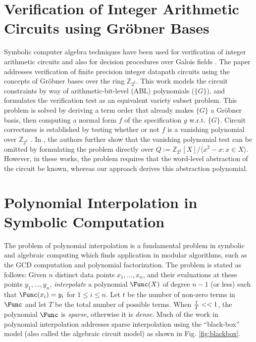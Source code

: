 \section{Verification of Integer Arithmetic Circuits using Gr\"obner Bases}
Symbolic computer algebra techniques have been used for verification
of integer arithmetic circuits \cite{wienand:cav08} and also for
decision procedures over Galois fields \cite{gao:gf-gb-ms}. The paper
\cite{wienand:cav08} addresses verification of finite precision
integer datapath circuits using the concepts of  Gr\"obner bases over
the ring ${\mathbb{Z}}_{2^k}$. This work models the circuit constraints by
way of arithmetic-bit-level (ABL) polynomials ($\{G\}$), and formulates
the verification test as an equivalent variety subset problem. This problem
is solved by deriving a term order that already makes $\{G\}$
a Gr\"obner basis, then computing a normal form $f$ of the
specification $g$ w.r.t. $\{G\}$. Circuit correctness is established
by testing whether or not $f$ is a vanishing
polynomial over ${\mathbb{Z}}_{2^k}$ \cite{shekhar:tcad07}.
In \cite{wedler:date11}, the
authors further show that the vanishing polynomial test can be omitted
by formulating the problem directly over $Q := {\mathbb{Z}}_{2^k}
[X]/\langle x^2-x : x \in X \rangle$.  
However, in these works, the problem requires that the word-level 
abstraction of the circuit be known, whereas our approach derives 
this abstraction polynomial. 

\section{Polynomial Interpolation in Symbolic Computation}

The problem of polynomial interpolation is a fundamental problem in
symbolic and algebraic computing which finds application in modular
algorithms, such as the GCD computation and polynomial
factorization. The problem is stated as follows: Given $n$ distinct
data points $x_1, \dots, x_n$, and their evaluations at these points
$y_1, \dots, y_n$,  {\it interpolate} a polynomial $\Func(X)$ of degree
$n-1$ (or less) such that $\Func(x_i) = y_i$ for $1 \leq i \leq n$. 
Let $t$ be the number of non-zero terms in $\Func$ and let $T$ be the
total number of possible terms. When ${{t} \over {T}} << 1$, the
polynomial $\Func$ is {\it sparse}, otherwise it is {\it dense}. Much of
the work in polynomial interpolation addresses sparse 
interpolation using the ``black-box'' model (also called the
algebraic circuit model) as shown in Fig. \ref{fig:blackbox}. 

